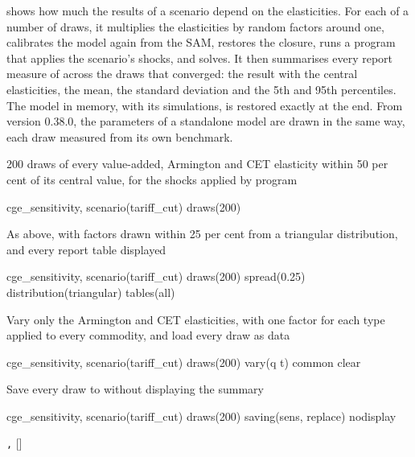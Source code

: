 

 shows how much the results of a scenario depend on the
elasticities. For each of a number of draws, it multiplies the elasticities
by random factors around one, calibrates the model again from the SAM,
restores the closure, runs a program that applies the scenario's shocks, and
solves. It then summarises every report measure of  across
the draws that converged: the result with the central elasticities, the
mean, the standard deviation and the 5th and 95th percentiles. The model in
memory, with its simulations, is restored exactly at the end. From version
0.38.0, the parameters of a standalone model are drawn in the same way, each
draw measured from its own benchmark.


200 draws of every value-added, Armington and CET elasticity within 50 per
cent of its central value, for the shocks applied by program 
\begin{stcode}
cge_sensitivity, scenario(tariff_cut) draws(200)
\end{stcode}
As above, with factors drawn within 25 per cent from a triangular distribution,
and every report table displayed
\begin{stcode}
cge_sensitivity, scenario(tariff_cut) draws(200) spread(0.25) distribution(triangular) tables(all)
\end{stcode}
Vary only the Armington and CET elasticities, with one factor for each type
applied to every commodity, and load every draw as data
\begin{stcode}
cge_sensitivity, scenario(tariff_cut) draws(200) vary(q t) common clear
\end{stcode}
Save every draw to  without displaying the summary
\begin{stcode}
cge_sensitivity, scenario(tariff_cut) draws(200) saving(sens, replace) nodisplay
\end{stcode}


\begin{stsyntax}
\texttt{,}  
[]
\end{stsyntax}

